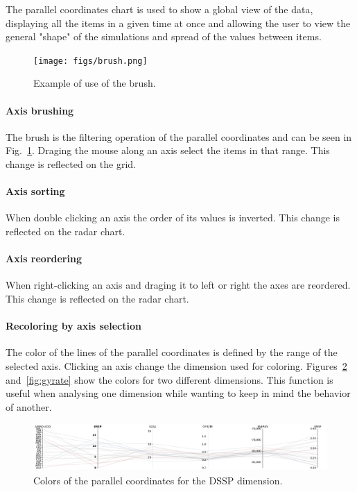 \documentclass[10pt, conference]{IEEEtran}
\begin{document}
The parallel coordinates chart is used to show a global view of the data, displaying all the items in a given time at once and allowing the user to view the general "shape" of the simulations and spread of the values between items.

\begin{figure}
\texttt{[image: figs/brush.png]}
\caption{Example of use of the brush.} 
\label{fig:brush}
\end{figure}
\paragraph*{Axis brushing} The brush is the filtering operation of the parallel coordinates and can be seen in Fig.~\ref{fig:brush}. Draging the mouse along an axis select the items in that range. This change is reflected on the grid.
\paragraph*{Axis sorting} When double clicking an axis the order of its values is inverted. This change is reflected on the radar chart.
\paragraph*{Axis reordering} When right-clicking an axis and draging it to left or right the axes are reordered. This change is reflected on the radar chart.
\paragraph*{Recoloring by axis selection} The color of the lines of the parallel coordinates is defined by the range of the selected axis. Clicking an axis change the dimension used for coloring. Figures~\ref{fig:dssp} and~\ref{fig:gyrate} show the colors for two different dimensions. This function is useful when analysing one dimension while wanting to keep in mind the behavior of another.

\begin{figure}
\includegraphics[width=1.0\linewidth]{figs/dssp.png}
\caption{Colors of the parallel coordinates for the DSSP dimension.} 
\label{fig:dssp}
\end{figure}
\end{document}
